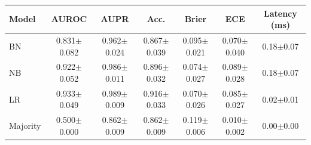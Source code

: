 \begin{tabular}{lcccccc}
\toprule
Model & AUROC & AUPR & Acc. & Brier & ECE & Latency (ms) \\
\midrule
BN & 0.831$\pm$0.082 & 0.962$\pm$0.024 & 0.867$\pm$0.039 & 0.095$\pm$0.021 & 0.070$\pm$0.040 & 0.18$\pm$0.07 \\
NB & 0.922$\pm$0.052 & 0.986$\pm$0.011 & 0.896$\pm$0.032 & 0.074$\pm$0.027 & 0.089$\pm$0.028 & 0.18$\pm$0.07 \\
LR & 0.933$\pm$0.049 & 0.989$\pm$0.009 & 0.916$\pm$0.033 & 0.070$\pm$0.026 & 0.085$\pm$0.027 & 0.02$\pm$0.01 \\
Majority & 0.500$\pm$0.000 & 0.862$\pm$0.009 & 0.862$\pm$0.009 & 0.119$\pm$0.006 & 0.010$\pm$0.002 & 0.00$\pm$0.00 \\
\bottomrule
\end{tabular}